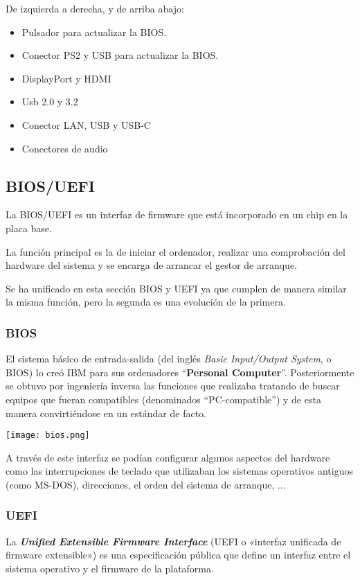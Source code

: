 De izquierda a derecha, y de arriba abajo:
\begin{itemize}
    \item Pulsador para actualizar la BIOS.
    \item Conector PS2 y USB para actualizar la BIOS.
    \item DisplayPort y HDMI
    \item Usb 2.0 y 3.2
    \item Conector LAN, USB y USB-C
    \item Conectores de audio
\end{itemize}


\subsection{BIOS/UEFI}
La BIOS/UEFI es un interfaz de firmware que está incorporado en un chip en la placa base.

La función principal es la de iniciar el ordenador, realizar una comprobación del hardware del sistema  y se encarga de arrancar el gestor de arranque.

Se ha unificado en esta sección BIOS y UEFI ya que cumplen de manera similar la misma función, pero la segunda es una evolución de la primera.

\subsubsection{BIOS}

El sistema básico de entrada-salida (del inglés \textit{Basic Input/Output System}, o BIOS) lo creó IBM para sus ordenadores “\textbf{Personal Computer}”. Posteriormente se obtuvo por ingeniería inversa las funciones que realizaba tratando de buscar equipos  que fueran compatibles (denominados “PC-compatible”) y de esta manera convirtiéndose en un estándar de facto.

\begin{center}
    \texttt{[image: bios.png]}
\end{center}

A través de este interfaz se podían configurar algunos aspectos del hardware como las interrupciones de teclado que utilizaban los sistemas operativos antiguos (como MS-DOS), direcciones, el orden del sistema de arranque, ...


\subsubsection{UEFI}
La \textit{\textbf{Unified Extensible Firmware Interface}} (UEFI o «interfaz unificada de firmware extensible») es una especificación pública que define un interfaz entre el sistema operativo y el firmware de la plataforma.


